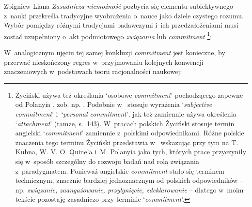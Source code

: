 \begin{artplenv}{Zbigniew Liana}
\textit{Zasadnicza niemożność} pozbycia się elementu subiektywnego z~nauki przekreśla tradycyjne wyobrażenia o~nauce jako dziele czystego rozumu. Wybór pomiędzy różnymi tradycjami badawczymi i~ich przedzałożeniami musi zostać uzupełniony o~akt podmiotowego \textit{związania} lub \textit{commitment}
\parencites[][s.~160]{zycinski_teizm_1985}[][s.~186n.191]{zycinski_elementy_1996}[][s.~253n.258]{zycinski_elementy_2015}%
\footnote{Życiński używa też określania ‘osobowe \textit{commitment}' pochodzącego zapewne od Polanyia 
\parencite*[][]{polanyi_personal_1962}, %
 zob. np. 
\parencite[][s.~79.125.165]{zycinski_teizm_1985}. %
 Podobnie w~
\parencite[][s.~137.144]{zycinski_structure_1988} %
 stosuje wyrażenia ‘\textit{subjective commitment}' i~‘\textit{personal commitment}', jak też zamiennie używa określenia ‘\textit{attachment}' (tamże, s.~143). W~pracach polskich Życiński stosuje termin angielski ‘\textit{commitment}' zamiennie z~polskimi odpowiednikami. Różne polskie znaczenia tego terminu Życiński przedstawia w~
\parencites[][s.~191]{zycinski_elementy_1996}[][s.~259n]{zycinski_elementy_2015} %
 wskazując przy tym na T. Kuhna, W. V. O. Quine'a i~M. Polanyia jako tych, których prace przyczyniły się w~sposób szczególny do rozwoju badań nad rolą związania z~paradygmatem. Ponieważ angielskie \textit{commitment} stało się terminem technicznym, znacznie bardziej jednoznacznym od polskich odpowiedników -- np. \textit{związanie, zaangażowanie, przylgnięcie, zdeklarowanie} -- dlatego w~moim tekście pozostaję zasadniczo przy terminie ‘\textit{commitment}'.}:



W~analogicznym ujęciu tej samej konkluzji \textit{commitment} jest konieczne, by przerwać nieskończony regres w~przyjmowaniu kolejnych konwencji znaczeniowych w~podstawach teorii racjonalności naukowej:


\end{artplenv}
